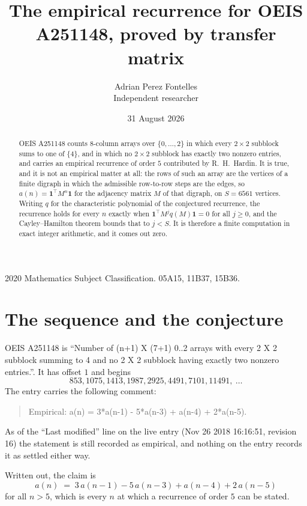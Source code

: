 \documentclass[11pt,a4paper]{article}
\title{The empirical recurrence for OEIS A251148, proved by transfer matrix}
\author{Adrian Perez Fontelles\\ \small Independent researcher}
\date{31 August 2026}
\theoremstyle{plain}
\theoremstyle{definition}
\begin{document}
\maketitle

\begin{abstract}
OEIS A251148 counts $8$-column arrays over $\{0,\dots,2\}$ in which every
$2\times2$ subblock sums to one of $\{4\}$, and in which no $2\times2$ subblock has exactly two nonzero entries, and carries an empirical
recurrence of order $5$ contributed by R.~H.~Hardin. It is true, and it is not an
empirical matter at all: the rows of such an array are the vertices of a finite digraph in
which the admissible row-to-row steps are the edges, so $a(n)=\mathbf{1}^{\!\top}M^{n}
\mathbf{1}$ for the adjacency matrix $M$ of that digraph, on $S=6561$ vertices. Writing
$q$ for the characteristic polynomial of the conjectured recurrence, the recurrence holds
for every $n$ exactly when $\mathbf{1}^{\!\top}M^{j}q(M)\mathbf{1}=0$ for all
$j\ge0$, and the Cayley--Hamilton theorem bounds that to $j<S$. It is therefore a finite
computation in exact integer arithmetic, and it comes out zero.
\end{abstract}

\noindent\small 2020 Mathematics Subject Classification. 05A15, 11B37, 15B36.\normalsize

\section{The sequence and the conjecture}

OEIS A251148 is ``Number of (n+1) X (7+1) 0..2 arrays with every 2 X 2 subblock summing to 4 and no 2 X 2 subblock having exactly two nonzero entries.''. It has offset $1$
and begins
\[
853, 1075, 1413, 1987, 2925, 4491, 7101, 11491,\ \dots
\]
The entry carries the following comment:
\begin{quote}\small
Empirical: a(n) = 3*a(n-1) - 5*a(n-3) + a(n-4) + 2*a(n-5).
\end{quote}
As of the ``Last modified'' line on the live entry (Nov 26 2018 16:16:51, revision 16) the statement is
still recorded as empirical, and nothing on the entry records it as settled either way.

Written out, the claim is
\begin{equation}\label{eq:conj}
a(n)\;=\;3\,a(n-1) - 5\,a(n-3) + a(n-4) + 2\,a(n-5)
\end{equation}
for all $n>5$, which is every $n$ at which a recurrence of order $5$ can be
stated.
\end{document}
